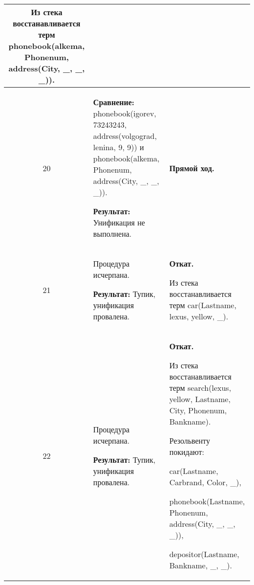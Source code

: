 \begin{longtable}{|c|p{}|p{}|}
    Из стека восстанавливается терм \newline
    phonebook(alkema, Phonenum, address(City, \_, \_, \_)).
                       \\ \hline

    20
                       &
\textbf{Сравнение:} \newline
  phonebook(igorev, 73243243,
            address(volgograd, lenina,       9,  9))
    \newline и \newline
    phonebook(alkema, Phonenum, address(City, \_, \_, \_)).
    \newline

    \textbf{Результат:} \newline
    Унификация не выполнена.
                       &
    \textbf{Прямой ход.}
                       \\ \hline

    21
                       &
    Процедура исчерпана.
    \newline

    \textbf{Результат:} \newline
    Тупик, унификация провалена.
                       &
    \textbf{Откат.}
    \newline

    Из стека восстанавливается терм \newline
    car(Lastname, lexus, yellow, \_).
                       \\ \hline

    22
                       &
    Процедура исчерпана.
    \newline

    \textbf{Результат:} \newline
    Тупик, унификация провалена.
                       &
    \textbf{Откат.}
    \newline

    Из стека восстанавливается терм \newline
  search(lexus, yellow, Lastname, City, Phonenum, Bankname).
    \newline

    Резольвенту покидают:

    car(Lastname, Carbrand, Color, \_),

    phonebook(Lastname, Phonenum, address(City, \_, \_, \_)),

    depositor(Lastname, Bankname, \_, \_).
                       \\ \hline


\end{longtable}
